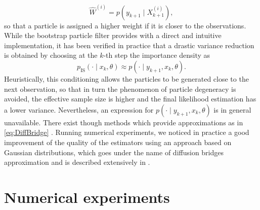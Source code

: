 \documentclass[10pt]{article}
\begin{document}
\begin{equation}
	\widehat W^{(i)} = p(y_{k+1} \mid X^{(i)}_{k+1}),
\end{equation}
so that a particle is assigned a higher weight if it is closer to the observations. While the bootstrap particle filter provides with a direct and intuitive implementation, it has been verified in practice that a drastic variance reduction is obtained by choosing at the $k$-th step the importance density as
\begin{equation}\label{eq:DiffBridge}
	p_{\mathrm{IS}}(\cdot \mid x_k, \theta) \approx p(\cdot \mid y_{k+1}, x_k, \theta).
\end{equation}
Heuristically, this conditioning allows the particles to be generated close to the next observation, so that in turn the phenomenon of particle degeneracy is avoided, the effective sample size is higher and the final likelihood estimation has a lower variance. Nevertheless, an expression for $p(\cdot \mid y_{k+1}, x_k, \theta)$ is in general unavailable. There exist though methods which provide approximations as in \eqref{eq:DiffBridge} \cite{GoW10, GoW11}. Running numerical experiments, we noticed in practice a good improvement of the quality of the estimators using an approach based on Gaussian distributions, which goes under the name of diffusion bridges approximation and is described extensively in \cite{GoW11}.


\section{Numerical experiments}





\end{document}
